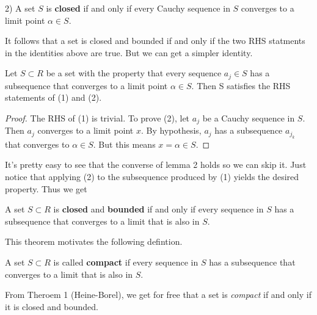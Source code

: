 \documentclass{article}
\begin{document}
2) A set \( S \) is \textbf{closed} if and only if every Cauchy sequence in \( S \) 
converges to a limit point \( \alpha \in S \).
\medbreak

It follows that a set is closed and bounded if and only if the two RHS statments in the
identities above are true. But we can get a simpler identity.

\begin{lemma}
    Let \( S \subset R \) be a set with the property that every sequence \( a_j \in S \) 
    has a subsequence that converges to a limit point \( \alpha \in S \). Then S satisfies
    the RHS statements of (1) and (2).
\end{lemma}

\begin{proof}
    The RHS of (1) is trivial. To prove (2), let \( a_j \) be a Cauchy sequence in \( S \).
    Then \( a_j \) converges to a limit point \( x \). By hypothesis, \( a_j \) 
    has a subsequence \( a_{j_k} \) that converges to \( \alpha \in S \). But this
    means \( x = \alpha \in S \).
\end{proof}
It's pretty easy to see that the converse of lemma 2 holds so we can skip it. Just
notice that applying (2) to the subsequence produced by (1) yields the desired property.
\medbreak
Thus we get

\begin{theorem}
    A set \( S \subset R \) is \textbf{closed} and \textbf{bounded} if and only if
    every sequence in \( S \) has 
    a subsequence that converges to a limit that is also in \( S \).
\end{theorem}

This theorem motivates the following defintion. 

\begin{definition}
    A set \( S \subset R \) is called \textbf{compact} if every sequence in \( S \) has 
    a subsequence that converges to a limit that is also in \( S \).
\end{definition}

From Theroem 1 (Heine-Borel), we get for free that a set is \textit{compact} if and 
only if it is closed and bounded.
\end{document}
